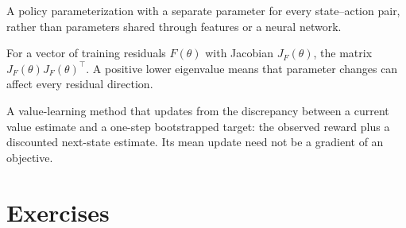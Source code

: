 \documentclass[11pt,twoside]{article}
\theoremstyle{definition}
\theoremstyle{remark}
\begin{document}
\begin{description}[style=nextline,leftmargin=1.5em,labelindent=0pt]
\item[Tabular policy]
A policy parameterization with a separate parameter for every state--action
pair, rather than parameters shared through features or a neural network.
\item[Tangent Gram matrix]
For a vector of training residuals $F(\theta)$ with Jacobian $J_F(\theta)$,
the matrix $J_F(\theta)J_F(\theta)^\top$. A positive lower eigenvalue means
that parameter changes can affect every residual direction.
\item[Temporal-difference learning]
A value-learning method that updates from the discrepancy between a current
value estimate and a one-step bootstrapped target: the observed reward plus a
discounted next-state estimate. Its mean update need not be a gradient of an
objective.
\end{description}

\section{Exercises}
\label{sec:exercises}

\exerciseinstructions
\setcounter{courseexercise}{0}



















\end{document}
